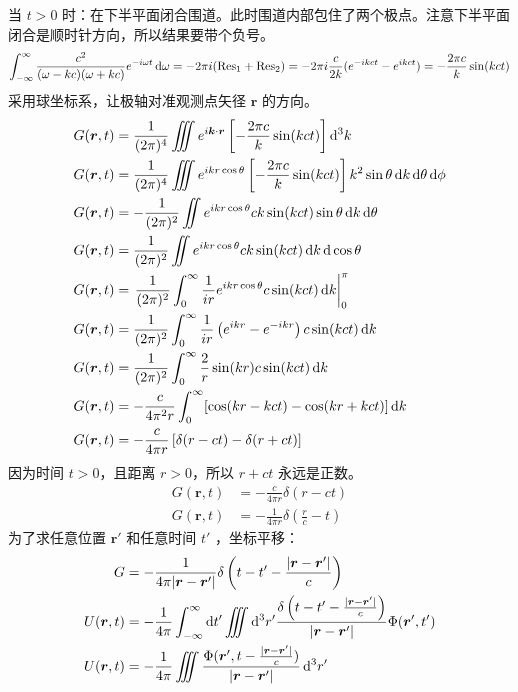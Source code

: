当 $t > 0$ 时：在下半平面闭合围道。此时围道内部包住了两个极点。注意下半平面闭合是顺时针方向，所以结果要带个负号。
$$
    \int_{-\infty}^{\infty}  \frac{c^2}{(\omega- kc)(\omega + kc)} e^{-i\omega t}\dif\omega = -2\pi i (\text{Res}_1 + \text{Res}_2) = -2\pi i \frac{c}{2k} (e^{-ikct} - e^{ikct})= -\frac{2\pi c}{k} \sin(kct)
$$
采用球坐标系，让极轴对准观测点矢径 $\boldsymbol{r}$ 的方向。
\begin{align*}
    G(\boldsymbol{r}, t) &= \frac{1}{(2\pi)^4} \iiint   e^{i\boldsymbol{k}\cdot\boldsymbol{r}} \left[ -\frac{2\pi c}{k} \sin(kct) \right]\dif^3k\\
    G(\boldsymbol{r}, t) &= \frac{1}{(2\pi)^4} \iiint   e^{ikr\cos\theta} \left[ -\frac{2\pi c}{k} \sin(kct) \right]k^2\sin\theta\dif k\dif \theta\dif \phi\\
    G(\boldsymbol{r}, t) &= -\frac{1}{(2\pi)^2} \iint   e^{ikr\cos\theta}  ck \sin(kct)\sin\theta\dif k\dif \theta\\
    G(\boldsymbol{r}, t) &= \frac{1}{(2\pi)^2} \iint   e^{ikr\cos\theta}  ck \sin(kct)\dif k\dif \cos\theta\\
    G(\boldsymbol{r}, t) &= \left.\frac{1}{(2\pi)^2} \int_0^\infty\frac{1}{ir}e^{ikr\cos\theta}  c \sin(kct)\dif k\right|_0^\pi\\
    G(\boldsymbol{r}, t) &= \frac{1}{(2\pi)^2} \int_0^\infty\frac{1}{ir}\left(e^{ikr}-e^{-ikr}\right)  c \sin(kct)\dif k\\
    G(\boldsymbol{r}, t) &= \frac{1}{(2\pi)^2} \int_0^\infty\frac{2}{r}\sin(kr)c \sin(kct)\dif k\\
    G(\boldsymbol{r}, t) &= -\frac{c}{4\pi^2 r} \int_0^\infty [\cos(kr-kct) - \cos(kr+kct)] \dif k\\
    G(\boldsymbol{r}, t) &= -\frac{c}{4\pi r} \left[ \delta(r-ct) - \delta(r+ct) \right]
\end{align*}
因为时间 $t > 0$，且距离 $r > 0$，所以 $r + ct$ 永远是正数。
\begin{align}
    G(\boldsymbol{r}, t) &= -\frac{c}{4\pi r} \delta(r-ct)\nonumber\\
    G(\boldsymbol{r}, t) &= -\frac{1}{4\pi r} \delta(\frac{r}{c}-t)
\end{align}
为了求任意位置 $\boldsymbol{r}'$ 和任意时间 $t'$ ，坐标平移：
\begin{align}
    G&= -\frac{1}{4\pi \vert{}\boldsymbol{r} - \boldsymbol{r}'\vert{}} \delta\left(t - t' - \frac{\vert{}\boldsymbol{r} - \boldsymbol{r}'\vert{}}{c}\right)\\
    U(\boldsymbol{r}, t) &= -\frac{1}{4\pi} \int_{-\infty}^{\infty} \dif t' \iiint \dif ^3r' \frac{\delta\left(t - t' - \frac{\vert{}\boldsymbol{r} - \boldsymbol{r}'\vert{}}{c}\right)}{\vert{}\boldsymbol{r} - \boldsymbol{r}'\vert{}} \Phi(\boldsymbol{r}', t')\nonumber\\
    U(\boldsymbol{r}, t) &= -\frac{1}{4\pi}  \iiint  \frac{\Phi(\boldsymbol{r}', t-\frac{\vert{}\boldsymbol{r} - \boldsymbol{r}'\vert{}}{c})}{\vert{}\boldsymbol{r} - \boldsymbol{r}'\vert{}} \dif ^3r'
\end{align}
